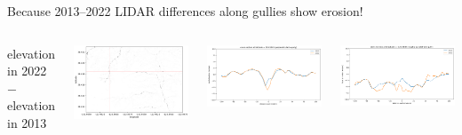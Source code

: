 \documentclass[aspectratio=169]{beamer}
\begin{document}
\begin{frame}{Because 2013--2022 LIDAR differences along gullies show erosion!}
\vspace{0.35 cm}
\begin{columns}
\centering elevation in 2022 $-$ elevation in 2013

\includegraphics[width=\linewidth]{img/elevation-profile-0.png}

\includegraphics[width=\linewidth]{img/elevation-profile-1.png}

\includegraphics[width=\linewidth]{img/elevation-profile-2.png}
\end{columns}
\end{frame}
\end{document}
